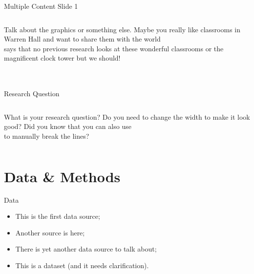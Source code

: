 \documentclass[usenames,dvipsnames]{beamer}
\begin{document}
\begin{frame}{Multiple Content Slide 1}
\begin{columns}
\begin{column}{0.65\textwidth}
\begin{figure}
            \end{figure}
            Talk about the graphics or something else. Maybe you really like classrooms in Warren Hall and want to share them with the world \citep{Warren_food_1921}\\
            \vspace{10pt}
            \citet{Berry_food_2018} says that no previous research looks at these wonderful classrooms or the magnificent clock tower but we should!
        \end{column} 
    \end{columns}
\end{frame}

\section{}

\begin{frame}{Research Question}
    \begin{columns}
        \begin{column}{.7\textwidth}\centering
            What is your research question? Do you need to change the width to make it look good? Did you know that you can also use \\ to manually break the lines?
        \end{column}
    \end{columns}
\end{frame}

\section{Data \& Methods}

\begin{frame}{Data}
    \begin{itemize}
        \item This is the first data source;
        \item Another source is here;
        \item There is yet another data source to talk about;
        \item This is a dataset (and it needs clarification).
    \end{itemize}
\end{frame}
\end{document}
